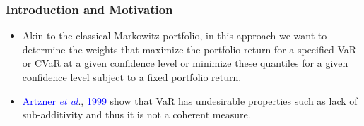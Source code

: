 \documentclass[pdf,10pt,xcolor=dvipsnames,hide notes]{beamer}
\begin{document}
\begin{frame}[label=frame1d]
	\frametitle{Introduction and Motivation}
	
	\begin{itemize}
		\justifying
		
		\item Akin to
				the classical Markowitz portfolio, in this approach we want to determine
				the weights that maximize the portfolio return for a specified VaR or CVaR
				at a given confidence level or minimize these quantiles for a given
				confidence level subject to a fixed portfolio return.
				
				\vspace{0.3cm}
				
				\item  \textcolor{blue}{Artzner \emph{et al}}., \textcolor{blue}{1999} show that VaR has undesirable properties such as lack
				of sub-additivity and thus it is not a coherent measure.
		
			\end{itemize}
	
\end{frame}
\end{document}
